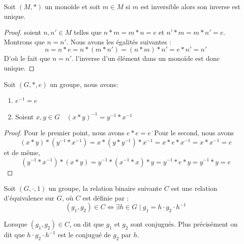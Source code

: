 \begin{proposition}
     Soit $(M,*)$ un monoïde et soit $m\in M$ si $m$ est inversible alors son inverse est unique.
\end{proposition}

\begin{proof}
    soient $n,n'\in M$ telles que $n*m=m*n=e$ et $n'*m=m*n'=e$. Montrons que $n=n'$. Nous avons les égalités suivantes : 
    \begin{equation*}
    n=n*e=n*(m*n')=(n*m)*n'=e*n'=n'
    \end{equation*}
    D'où le fait que $n=n'$. l'inverse d'un élément dans un monoïde est donc unique.
\end{proof}

\begin{proposition}
Soit $(G,*,e)$ un groupe, nous avons:
\begin{enumerate}
    \item $e^{-1}=e$
    \item Soient $x,y\in G\quad (x*y)^{-1}=y^{-1}*x^{-1}$
\end{enumerate}
\end{proposition}

\begin{proof}
    Pour le premier point, nous avons $e*e=e$\.\
    Pour le second, nous avons
    \begin{equation*}
        (x*y)*(y^{-1}*x^{-1})=x*(y*y^{-1})*x^{-1}=x*e*x^{-1}=x*x^{-1}=e
    \end{equation*}
    et de même,
    \begin{equation*}
        (y^{-1}*x^{-1})*(x*y)=y^{-1}*(x^{-1}*x)*y=y^{-1}*e*y=y^{-1}*y=e
    \end{equation*}
\end{proof}

\begin{theoreme}
Soit $(G,\cdot,1)$ un groupe, la relation binaire suivante $C$ est une relation d'équivalence sur $G$, où $C$ est définie par :
\begin{equation*}
    (g_1,g_2)\in C \Leftrightarrow \exists h\in G \mid g_1= h\cdot g_2 \cdot h^{-1}
\end{equation*}
\end{theoreme}

\begin{remarque}
    Lorsque $(g_1,g_2)\in C$, on dit que $g_1$ et $g_2$ sont conjugués. Plus précisément on dit que $h\cdot g_2 \cdot h^{-1}$ est le conjugué de $g_2 $ par $h$.
\end{remarque}

